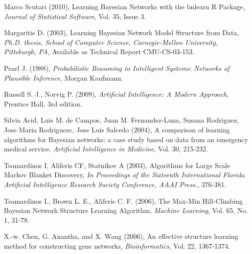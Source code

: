 \begin{bibliography}{99}
\begin{enumerate}
	 Marco Scutari (2010), Learning Bayesian Networks with the bnlearn R Package, \emph{Journal of Statistical Software}, Vol. 35, Issue 3.
	
	 Margaritis D. (2003), Learning Bayesian Network Model Structure from Data, \emph{Ph.D. thesis, School of Computer Science, Carnegie-Mellon University, Pittsburgh, PA}, Available as Technical Report CMU-CS-03-153.

	 Pearl J. (1988), \emph{Probabilistic Reasoning in Intelligent Systems: Networks of Plausible Inference}, Morgan Kaufmann.
	
	 Russell S. J., Norvig P. (2009), \emph{Artificial Intelligence: A Modern Approach}, Prentice Hall, 3rd edition.
	
     Silvia Acid, Luis M. de Campos, Juan M. Fernandez-Luna, Susana Rodriguez, Jose Maria Rodriguezc, Jose Luis Salcedo (2004), A comparison of learning algorithms for Bayesian networks: a case study based on data from an emergency medical service, \emph{Artificial Intelligence in Medicine}, Vol. 30, 215-232.
	
	 Tsamardinos I, Aliferis CF, Statnikov A (2003), Algorithms for Large Scale Markov Blanket Discovery, \emph{In Proceedings of the Sixteenth International Florida Artificial Intelligence Research Society Conference, AAAI Press.}, 376-381.
	
	 Tsamardinos I., Brown L. E., Aliferis C. F. (2006), The Max-Min Hill-Climbing Bayesian Network Structure Learning Algorithm, \emph{Machine Learning}, Vol. 65, No. 1, 31-78.
	
     X.-w. Chen, G. Anantha, and X. Wang (2006), An effective structure learning method for constructing gene networks, \emph{Bioinformatics}, Vol. 22, 1367-1374.
\end{enumerate}
\end{bibliography}
